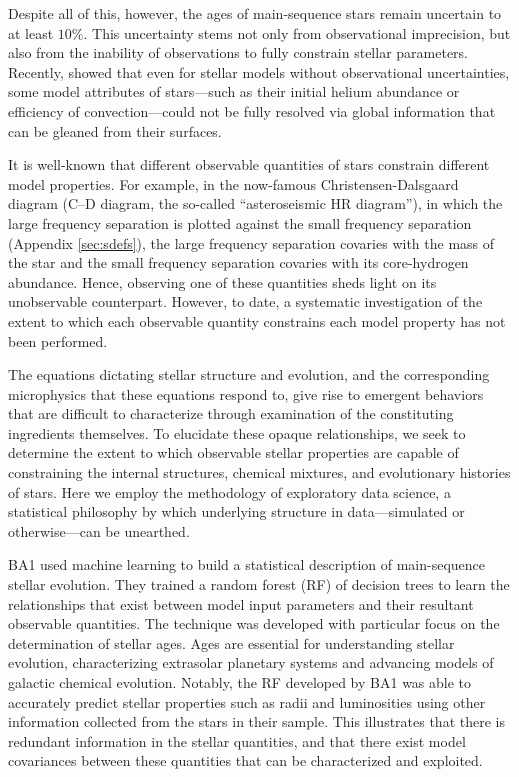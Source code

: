 Despite all of this, however, the ages of main-sequence stars remain uncertain to at least  $10\%$. This uncertainty stems not only from observational imprecision, but also from the inability of observations to fully constrain stellar parameters.  
Recently,  showed that even for stellar models without observational uncertainties, some model attributes of stars---such as their initial helium abundance or efficiency of convection---could not be fully resolved via global information that can be gleaned from their surfaces. 


It is well-known that different observable quantities of stars constrain different model properties. For example, in the now-famous Christensen-Dalsgaard diagram (C--D diagram, the so-called ``asteroseismic HR diagram''), in which the large frequency separation is plotted against the small frequency separation (Appendix \ref{sec:sdefs}), the large frequency separation covaries with the mass of the star and the small frequency separation covaries with its core-hydrogen abundance. Hence, observing one of these quantities sheds light on its unobservable counterpart.
However, to date, a systematic investigation of the extent to which each observable quantity constrains each model property has not been performed.

The equations dictating stellar structure and evolution, and the corresponding microphysics that these equations respond to, give rise to emergent behaviors that are difficult to characterize through examination of the constituting ingredients themselves. To elucidate these opaque relationships, we seek to determine the extent to which observable stellar properties are capable of constraining the internal structures, chemical mixtures, and evolutionary histories of stars. Here we employ the methodology of exploratory data science, a statistical philosophy by which underlying structure in data---simulated or otherwise---can be unearthed.



BA1 used machine learning to build a statistical description of main-sequence stellar evolution. They trained a random forest (RF) of decision trees to learn the relationships that exist between model input parameters and their resultant observable quantities. The technique was developed with particular focus on the determination of stellar ages.  Ages are essential for understanding stellar evolution, characterizing extrasolar planetary systems and advancing models of galactic chemical evolution. 
Notably, the RF developed by BA1 was able to accurately predict stellar properties such as radii and luminosities using other information collected from the stars in their sample. This illustrates that there is redundant information in the stellar quantities, and that there exist model covariances between these quantities that can be characterized and exploited. 



